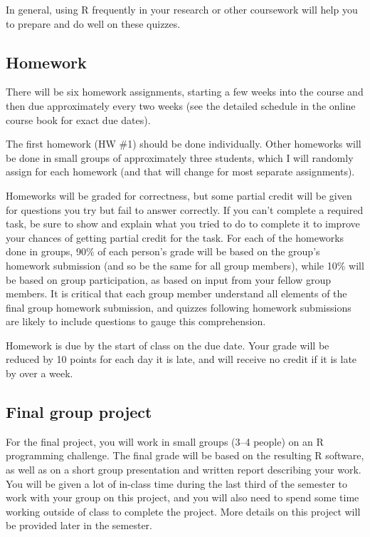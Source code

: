 \documentclass[]{book}
\theoremstyle{definition}
\theoremstyle{definition}
\theoremstyle{definition}
\theoremstyle{remark}
\begin{document}
In general, using R frequently in your research or other coursework will
help you to prepare and do well on these quizzes.

\subsection{Homework}\label{homework}

There will be six homework assignments, starting a few weeks into the
course and then due approximately every two weeks (see the detailed
schedule in the online course book for exact due dates).

The first homework (HW \#1) should be done individually. Other homeworks
will be done in small groups of approximately three students, which I
will randomly assign for each homework (and that will change for most
separate assignments).

Homeworks will be graded for correctness, but some partial credit will
be given for questions you try but fail to answer correctly. If you
can't complete a required task, be sure to show and explain what you
tried to do to complete it to improve your chances of getting partial
credit for the task. For each of the homeworks done in groups, 90\% of
each person's grade will be based on the group's homework submission
(and so be the same for all group members), while 10\% will be based on
group participation, as based on input from your fellow group members.
It is critical that each group member understand all elements of the
final group homework submission, and quizzes following homework
submissions are likely to include questions to gauge this comprehension.

Homework is due by the start of class on the due date. Your grade will
be reduced by 10 points for each day it is late, and will receive no
credit if it is late by over a week.

\subsection{Final group project}\label{final-group-project}

For the final project, you will work in small groups (3--4 people) on an
R programming challenge. The final grade will be based on the resulting
R software, as well as on a short group presentation and written report
describing your work. You will be given a lot of in-class time during
the last third of the semester to work with your group on this project,
and you will also need to spend some time working outside of class to
complete the project. More details on this project will be provided
later in the semester.
\end{document}
